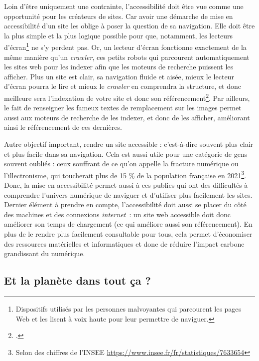 Loin d’être uniquement une contrainte, l’accessibilité doit être vue comme une opportunité pour les créateurs de sites. Car avoir une démarche de mise en accessibilité d’un site les oblige à poser la question de sa navigation. Elle doit être la plus simple et la plus logique possible pour que, notamment, les lecteurs d’écran\footnote{Dispositifs utilisés par les personnes malvoyantes qui parcourent les pages Web et les lisent à voix haute pour leur permettre de naviguer.} ne s’y perdent pas. Or, un lecteur d’écran fonctionne exactement de la même manière qu’un \textit{crawler}, ces petits robots qui parcourent automatiquement les sites web pour les indexer afin que les moteurs de recherche puissent les afficher. Plus un site est clair, sa navigation fluide et aisée, mieux le lecteur d’écran pourra le lire et mieux le \textit{crawler} en comprendra la structure, et donc meilleure sera l’indexation de votre site et donc son référencement\footcite{adminat_et_2023}. Par ailleurs, le fait de renseigner les fameux textes de remplacement sur les images permet aussi aux moteurs de recherche de les indexer, et donc de les afficher, améliorant ainsi le référencement de ces dernières.

Autre objectif important, rendre un site accessible : c’est-à-dire souvent plus clair et plus facile dans sa navigation. Cela est aussi utile pour une catégorie de gens souvent oubliés : ceux souffrant de ce qu’on appelle la fracture numérique ou l’illectronisme, qui toucherait plus de 15 \% de la population française en 2021\footnote{Selon des chiffres de l'INSEE \url{https://www.insee.fr/fr/statistiques/7633654}}. Donc, la mise en accessibilité permet aussi à ces publics qui ont des difficultés à comprendre l’univers numérique de naviguer et d’utiliser plus facilement les sites. Dernier élément à prendre en compte, l’accessibilité doit aussi se placer du côté des machines et des connexions \textit{internet} : un site web accessible doit donc améliorer son temps de chargement (ce qui améliore aussi son référencement). En plus de le rendre plus facilement consultable pour tous, cela permet d’économiser des ressources matérielles et informatiques et donc de réduire l’impact carbone grandissant du numérique.

\subsection{Et la planète dans tout ça ?}


